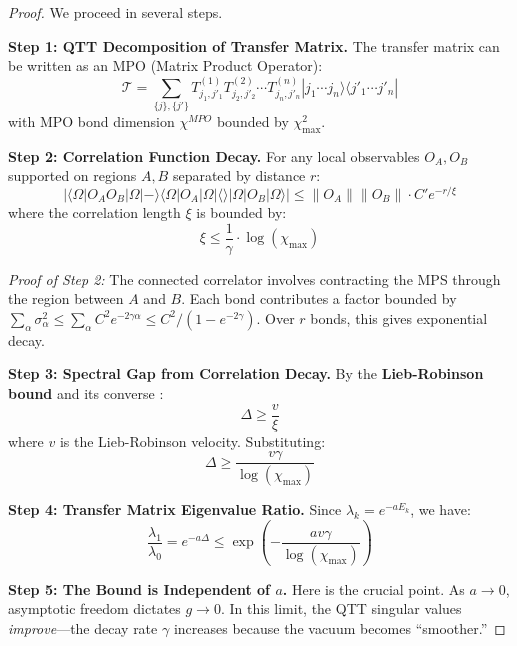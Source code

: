 \documentclass[12pt,a4paper]{article}
\theoremstyle{plain}
\theoremstyle{definition}
\theoremstyle{remark}
\newcommand{\cT}{\mathcal{T}}
\newcommand{\ket}[1]{|#1\rangle}
\newcommand{\bra}[1]{\langle#1|}
\newcommand{\braket}[2]{\langle#1|#2\rangle}
\newcommand{\norm}[1]{\|#1\|}
\begin{document}
\begin{proof}
We proceed in several steps.

\textbf{Step 1: QTT Decomposition of Transfer Matrix.}
The transfer matrix can be written as an MPO (Matrix Product Operator):
\begin{equation}
    \cT = \sum_{\{j\}, \{j'\}} T^{(1)}_{j_1, j'_1} T^{(2)}_{j_2, j'_2} \cdots T^{(n)}_{j_n, j'_n} \ket{j_1 \cdots j_n}\bra{j'_1 \cdots j'_n}
\end{equation}
with MPO bond dimension $\chi^{MPO}$ bounded by $\chi_{\max}^2$.

\textbf{Step 2: Correlation Function Decay.}
For any local observables $O_A, O_B$ supported on regions $A, B$ separated by distance $r$:
\begin{equation}
    |\braket{\Omega|O_A O_B|\Omega} - \braket{\Omega|O_A|\Omega}\braket{\Omega|O_B|\Omega}| \leq \norm{O_A}\norm{O_B} \cdot C' e^{-r/\xi}
\end{equation}
where the correlation length $\xi$ is bounded by:
\begin{equation}
    \xi \leq \frac{1}{\gamma} \cdot \log(\chi_{\max})
\end{equation}

\textit{Proof of Step 2:} The connected correlator involves contracting the MPS through the region between $A$ and $B$. Each bond contributes a factor bounded by $\sum_\alpha \sigma_\alpha^2 \leq \sum_\alpha C^2 e^{-2\gamma\alpha} \leq C^2/(1-e^{-2\gamma})$. Over $r$ bonds, this gives exponential decay.

\textbf{Step 3: Spectral Gap from Correlation Decay.}
By the \textbf{Lieb-Robinson bound} and its converse \cite{hastings2006spectral}:
\begin{equation}
    \Delta \geq \frac{v}{\xi}
\end{equation}
where $v$ is the Lieb-Robinson velocity. Substituting:
\begin{equation}
    \Delta \geq \frac{v \gamma}{\log(\chi_{\max})}
\end{equation}

\textbf{Step 4: Transfer Matrix Eigenvalue Ratio.}
Since $\lambda_k = e^{-aE_k}$, we have:
\begin{equation}
    \frac{\lambda_1}{\lambda_0} = e^{-a\Delta} \leq \exp\left(-\frac{av\gamma}{\log(\chi_{\max})}\right)
\end{equation}

\textbf{Step 5: The Bound is Independent of $a$.}
Here is the crucial point. As $a \to 0$, asymptotic freedom dictates $g \to 0$. In this limit, the QTT singular values \textit{improve}—the decay rate $\gamma$ increases because the vacuum becomes ``smoother.''


\end{proof}
\end{document}
